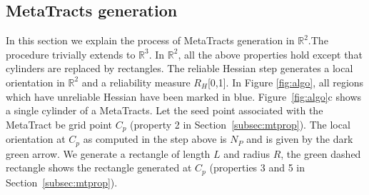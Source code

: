 

\subsection {MetaTracts generation}
\label{subsec:MetaTracts-generation}
 In this section we explain the process of MetaTracts generation in $\mathbb{R}^2$.The procedure trivially extends to $\mathbb{R}^3$. In $\mathbb{R}^2$, all the above properties hold except that cylinders are replaced by rectangles. The reliable Hessian step  generates a local orientation in $\mathbb{R}^2$ and a reliability measure $R_H$[0,1]. In Figure \ref{fig:algo}, all regions which have unreliable Hessian have been marked in blue. Figure~\ref{fig:algo}c shows a single cylinder of a MetaTracts. Let the seed point associated with the MetaTract be grid point $C_{p}$ (property 2 in Section~\ref{subsec:mtprop}). The local orientation at $C_p$ as computed in the step above is $N_P$ and is given by the dark green arrow. We generate a rectangle of length $L$ and radius $R$, the green dashed rectangle shows the rectangle generated at $C_p$ (properties 3 and 5 in Section~\ref{subsec:mtprop}). 

